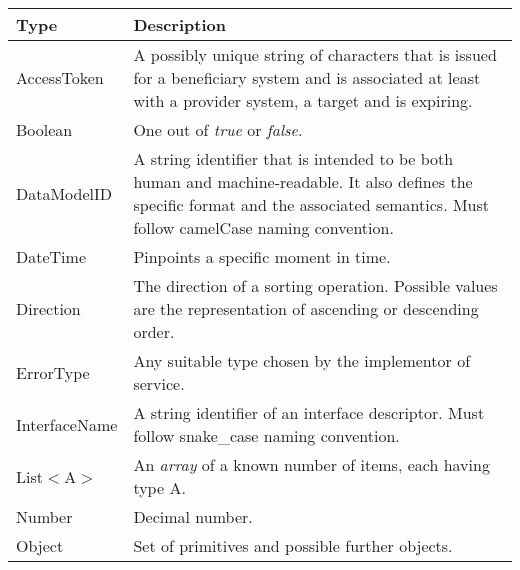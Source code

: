 \documentclass[a4paper]{arrowhead}
\newcommand{\pdef}[1]{{\textcolor{ArrowheadGrey}{#1\label{sec:model:primitives:#1}\label{sec:model:primitives:#1s}\label{sec:model:primitives:#1es}}}}
\begin{document}
\begin{table}[ht!]
\begin{tabularx}{\textwidth}{| p{5cm} | X |} \hline
\rowcolor{gray!33} Type & Description \\ \hline
\pdef{AccessToken} & A possibly unique string of characters that is issued for a beneficiary system
and is associated at least with a provider system, a target and is expiring. \\ \hline
\pdef{Boolean} & One out of \textit{true} or \textit{false}. \\ \hline
\pdef{DataModelID} & A string identifier that is intended to be both human and machine-readable. It also defines the specific format and the associated semantics. Must follow camelCase naming convention. \\ \hline
\pdef{DateTime}         & Pinpoints a specific moment in time. \\ \hline
\pdef{Direction}        & The direction of a sorting operation. Possible values are the representation of ascending or descending order. \\ \hline
\pdef{ErrorType}        & Any suitable type chosen by the implementor of service. \\ \hline
\pdef{InterfaceName}    & A string identifier of an interface descriptor. Must follow snake\_case naming convention. \\ \hline
\pdef{List}$<$A$>$      & An \textit{array} of a known number of items, each having type A. \\ \hline
\pdef{Number}           & Decimal number. \\ \hline
\pdef{Object}           & Set of primitives and possible further objects. \\ \hline
\end{tabularx}
\end{table}
\end{document}
